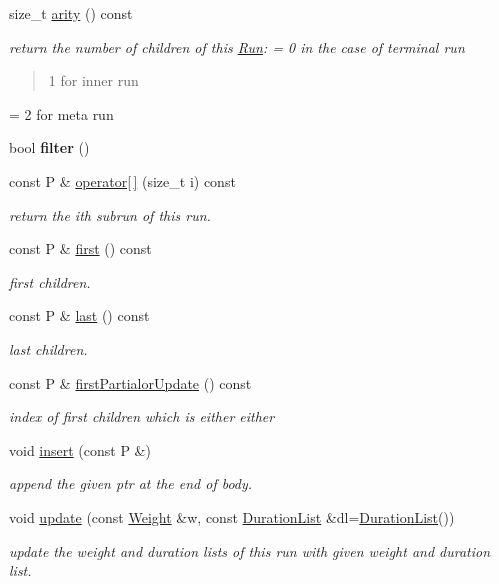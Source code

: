 \begin{DoxyCompactItemize}
size\+\_\+t \mbox{\hyperlink{classRun_ab9eeb2e8033cf68b80099e56ddca8ff1}{arity}} () const
\begin{DoxyCompactList}\small\item\em return the number of children of this \mbox{\hyperlink{classRun}{Run}}\+: = 0 in the case of terminal run \begin{quote}
1 for inner run \end{quote}
= 2 for meta run \end{DoxyCompactList}\item 
\mbox{\label{classRun_a1da9ef823788854753f7641bd872cf50}} 
bool {\bfseries filter} ()
\item 
const P \& \mbox{\hyperlink{classRun_a17781141b67e9cd2675c0dad722de2ec}{operator\mbox{[}$\,$\mbox{]}}} (size\+\_\+t i) const
\begin{DoxyCompactList}\small\item\em return the ith subrun of this run. \end{DoxyCompactList}\item 
const P \& \mbox{\hyperlink{classRun_a6b635ca66114e64fbcb91a5a9652d78d}{first}} () const
\begin{DoxyCompactList}\small\item\em first children. \end{DoxyCompactList}\item 
const P \& \mbox{\hyperlink{classRun_a49c0418a8ab9eb372e09d7d5c813e0aa}{last}} () const
\begin{DoxyCompactList}\small\item\em last children. \end{DoxyCompactList}\item 
const P \& \mbox{\hyperlink{classRun_a94a0bfa98d5891b750ba88e5f31441ad}{first\+Partialor\+Update}} () const
\begin{DoxyCompactList}\small\item\em index of first children which is either either \end{DoxyCompactList}\item 
void \mbox{\hyperlink{classRun_ab41a4b6f0347b7b412637d505614b98f}{insert}} (const P \&)
\begin{DoxyCompactList}\small\item\em append the given ptr at the end of body. \end{DoxyCompactList}\item 
void \mbox{\hyperlink{classRun_afe9adec90106c1a7433b626aca320367}{update}} (const \mbox{\hyperlink{classWeight}{Weight}} \&w, const \mbox{\hyperlink{classDurationList}{Duration\+List}} \&dl=\mbox{\hyperlink{classDurationList}{Duration\+List}}())
\begin{DoxyCompactList}\small\item\em update the weight and duration lists of this run with given weight and duration list. \end{DoxyCompactList}\end{DoxyCompactItemize}
